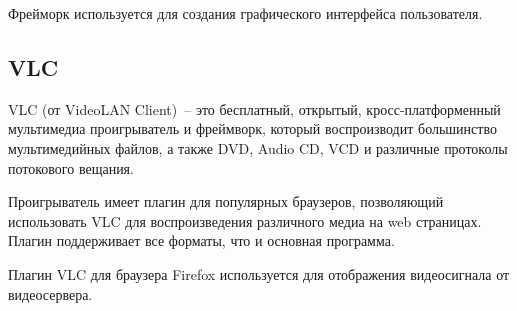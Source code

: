 Фрейморк используется для создания графического интерфейса пользователя.

\subsection{VLC}
VLC (от VideoLAN Client)~-- это бесплатный, открытый, кросс-платформенный мультимедиа
проигрыватель и фреймворк, который воспроизводит большинство мультимедийных файлов,
а также DVD, Audio CD, VCD и различные протоколы потокового вещания.

Проигрыватель имеет плагин для популярных браузеров, позволяющий использовать VLC для воспроизведения
различного медиа на web страницах. Плагин поддерживает все форматы, что и основная программа.

Плагин VLC для браузера Firefox используется для отображения видеосигнала от видеосервера.
